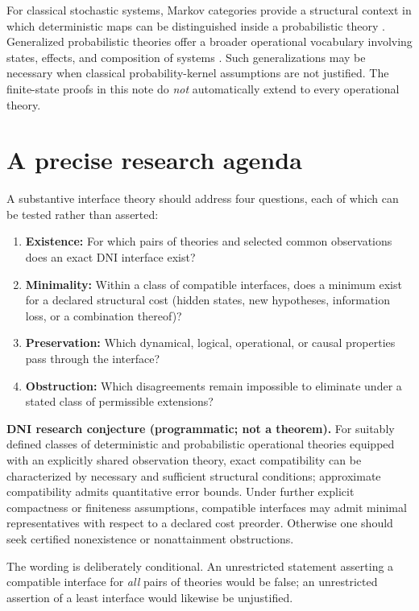 \documentclass[11pt,letterpaper]{article}
\theoremstyle{definition}
\theoremstyle{remark}
\begin{document}
For classical stochastic systems, Markov categories provide a structural context in which deterministic maps can be distinguished inside a probabilistic theory \cite{fritz2020}. Generalized probabilistic theories offer a broader operational vocabulary involving states, effects, and composition of systems \cite{barrett2007}. Such generalizations may be necessary when classical probability-kernel assumptions are not justified. The finite-state proofs in this note do \emph{not} automatically extend to every operational theory.

\section{A precise research agenda}
A substantive interface theory should address four questions, each of which can be tested rather than asserted:
\begin{enumerate}
\item \textbf{Existence:} For which pairs of theories and selected common observations does an exact DNI interface exist?
\item \textbf{Minimality:} Within a class of compatible interfaces, does a minimum exist for a declared structural cost (hidden states, new hypotheses, information loss, or a combination thereof)?
\item \textbf{Preservation:} Which dynamical, logical, operational, or causal properties pass through the interface?
\item \textbf{Obstruction:} Which disagreements remain impossible to eliminate under a stated class of permissible extensions?
\end{enumerate}
\begin{mainbox}
\textbf{DNI research conjecture (programmatic; not a theorem).} For suitably defined classes of deterministic and probabilistic operational theories equipped with an explicitly shared observation theory, exact compatibility can be characterized by necessary and sufficient structural conditions; approximate compatibility admits quantitative error bounds. Under further explicit compactness or finiteness assumptions, compatible interfaces may admit minimal representatives with respect to a declared cost preorder. Otherwise one should seek certified nonexistence or nonattainment obstructions.
\end{mainbox}
The wording is deliberately conditional. An unrestricted statement asserting a compatible interface for \emph{all} pairs of theories would be false; an unrestricted assertion of a least interface would likewise be unjustified.
\end{document}
